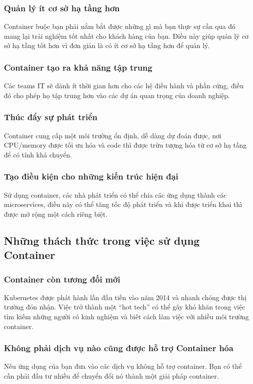 \documentclass[14pt,a4paper]{book}
\begin{document}
			\subsubsection{Quản lý ít cơ sở hạ tầng hơn}
		\hspace{0.6cm}Container buộc bạn phải nắm bắt được những gì mà bạn thực sự cần qua đó mang lại trải nghiệm tốt nhất cho khách hàng của bạn. Điều này giúp quản lý cơ sở hạ tầng tốt hơn vì đơn giản là có ít cơ sở hạ tầng hơn để quản lý.
			\subsubsection{Container tạo ra khả năng tập trung}
		\hspace{0.6cm}Các teams IT sẽ dành ít thời gian hơn cho các hệ điều hành và phần cứng, điều đó cho phép họ tập trung hơn vào các dự án quan trọng của doanh nghiệp.
			\subsubsection{Thúc đẩy sự phát triển}
		\hspace{0.6cm}Container cung cấp một môi trường ổn định, dễ dàng dự đoán được, nơi CPU/memory được tối ưu hóa và code thì được trừu tượng hóa từ cơ sở hạ tầng để có tính khả chuyển.
			\subsubsection{Tạo điều kiện cho những kiến trúc hiện đại}
		\hspace{0.6cm}Sử dụng container, các nhà phát triển có thể chia các ứng dụng thành các microservices, điều này có thể tăng tốc độ phát triển và khi được triển khai thì được mở rộng một cách riêng biệt.
		\subsection{Những thách thức trong việc sử dụng Container}
			\subsubsection{Container còn tương đối mới}
		\hspace{0.6cm}Kubernetes được phát hành lần đầu tiền vào năm 2014 và nhanh chóng được thị trường đón nhận. Việc trở thành một “hot tech” có thể gây khó khăn trong việc tìm kiếm những người có kinh nghiệm và biết cách làm việc với nhiều môi trường container.
			\subsubsection{Không phải dịch vụ nào cũng được hỗ trợ Container hóa}
		\hspace{0.6cm}Nếu ứng dụng của bạn đưa vào các dịch vụ không hỗ trợ container. Bạn có thể cần phải đầu tư nhiều để chuyển đổi nó thành một giải pháp container.
\end{document}
